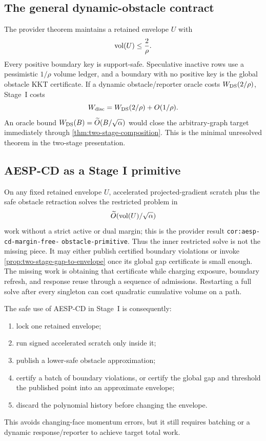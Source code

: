 \subsection{The general dynamic-obstacle contract}

The provider theorem
 maintains a retained envelope
$U$ with
\begin{equation}
 \operatorname{vol}(U)\leq\frac2\rho.
 \label{eq:two-stage-hard-cap}
\end{equation}
Every positive boundary key is support-safe.  Speculative inactive rows use a
pessimistic $1/\rho$ volume ledger, and a boundary with no positive key is the
global obstacle KKT certificate.  If a dynamic obstacle/reporter oracle costs
$W_{\rm DS}(2/\rho)$, Stage~I costs
\begin{equation}
 W_{\rm disc}=W_{\rm DS}(2/\rho)+O(1/\rho).
 \label{eq:two-stage-ds-work}
\end{equation}
An oracle bound
$W_{\rm DS}(B)=\widetilde O(B/\sqrt\alpha)$ would close the arbitrary-graph
target immediately through \cref{thm:two-stage-composition}.  This is the
minimal unresolved theorem in the two-stage presentation.

\subsection{AESP-CD as a Stage I primitive}

On any fixed retained envelope $U$, accelerated projected-gradient scratch
plus the safe obstacle retraction solves the restricted problem in
\begin{equation}
 \widetilde O(\operatorname{vol}(U)/\sqrt\alpha)
 \label{eq:two-stage-obstacle-primitive}
\end{equation}
work without a strict active or dual margin; this is the provider result
\texttt{cor:aesp-cd-margin-free-}\allowbreak
\texttt{obstacle-primitive}.  Thus the inner
restricted solve is not the missing piece.  It may either publish certified
boundary violations or invoke \cref{prop:two-stage-gap-to-envelope} once its
global gap certificate is small enough.  The missing work is obtaining that
certificate while charging exposure, boundary refresh, and response reuse
through a sequence of admissions.
Restarting a full solve after every singleton can cost quadratic cumulative
volume on a path.

The safe use of AESP-CD in Stage~I is consequently:
\begin{enumerate}[leftmargin=2.2em]
\item lock one retained envelope;
\item run signed accelerated scratch only inside it;
\item publish a lower-safe obstacle approximation;
\item certify a batch of boundary violations, or certify the global gap and
  threshold the published point into an approximate envelope;
\item discard the polynomial history before changing the envelope.
\end{enumerate}
This avoids changing-face momentum errors, but it still requires batching or
a dynamic response/reporter to achieve target total work.

